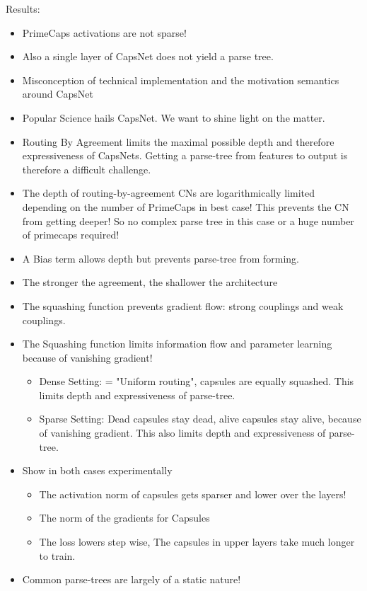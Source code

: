 \documentclass{article}
\begin{document}
Results:
\begin{itemize}
	\item PrimeCaps activations are not sparse!
	\item Also a single layer of CapsNet does not yield a parse tree.
	\item Misconception of technical implementation and the motivation semantics around CapsNet
	\item Popular Science hails CapsNet. We want to shine light on the matter.
	\item Routing By Agreement limits the maximal possible depth and therefore expressiveness of CapsNets. Getting a parse-tree from features to output is therefore a difficult challenge. 
	\item The depth of routing-by-agreement CNs are logarithmically limited depending on the number of PrimeCaps in best case! This prevents the CN from getting deeper! So no complex parse tree in this case or a huge number of primecaps required!
	\item A Bias term allows depth but prevents parse-tree from forming.
	\item The stronger the agreement, the shallower the architecture
	\item The squashing function prevents gradient flow: strong couplings and weak couplings.
	\item The Squashing function limits information flow and parameter learning because of vanishing gradient!
	\begin{itemize}
		\item Dense Setting: = "Uniform routing", capsules are equally squashed. This limits depth and expressiveness of parse-tree.
		\item Sparse Setting: Dead capsules stay dead, alive capsules stay alive, because of vanishing gradient. This also limits depth and expressiveness of parse-tree.
	\end{itemize}
	\item Show in both cases experimentally
	\begin{itemize}
		\item The activation norm of capsules gets sparser and lower over the layers!
		\item The norm of the gradients for Capsules
		\item The loss lowers step wise, The capsules in upper layers take much longer to train.
	\end{itemize}
	\item Common parse-trees are largely of a static nature!

\end{itemize}
\end{document}
